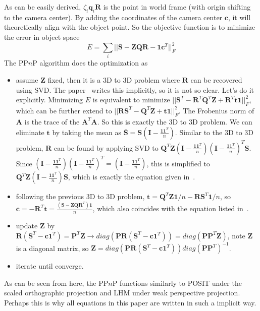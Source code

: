 \documentclass[a4paper]{article}
\begin{document}
As can be easily derived, $\zeta_i \mathbf{q}_i \mathbf{R}$ is the point in world frame (with origin shifting to the camera center). By adding the coordinates of the camera center $\mathbf{c}$, it will theoretically align with the object point. So the objective function is to minimize the error in object space
$$
E=\sum_{i} ||\mathbf{S}-\mathbf{ZQR}-\mathbf{1c}^T||_{F}^{2}
$$
The PP$n$P algorithm does the optimization as
\begin{itemize}
\item assume $\mathbf{Z}$ fixed, then it is a $3$D to $3$D problem where $\mathbf{R}$ can be recovered using SVD. The paper~\cite{garro2012solving} writes this implicitly, so it is not so clear. Let's do it explicitly. Minimizing $E$ is equivalent to minimize $||\mathbf{S}^T-\mathbf{R}^T\mathbf{Q}^T\mathbf{Z}+\mathbf{R}^T\mathbf{t1}||_{F}^{2}$, which can be further extend to $||\mathbf{R}\mathbf{S}^T-\mathbf{Q}^T\mathbf{Z}+\mathbf{t1}||_{F}^{2}$. The Frobenius norm of $\mathbf{A}$ is the trace of the $\mathbf{A}^T\mathbf{A}$. So this is exactly the $3$D to $3$D problem. We can eliminate $\mathbf{t}$ by taking the mean as $\bar{\mathbf{S}}=\mathbf{S}(\mathbf{I}-\frac{\mathbf{11}^T}{n})$. Similar to the $3$D to $3$D problem, $\mathbf{R}$ can be found by applying SVD to $\mathbf{Q}^T\mathbf{Z}(\mathbf{I}-\frac{\mathbf{11}^T}{n})(\mathbf{I}-\frac{\mathbf{11}^T}{n})^T\mathbf{S}$. Since $(\mathbf{I}-\frac{\mathbf{11}^T}{n})(\mathbf{I}-\frac{\mathbf{11}^T}{n})^T=(\mathbf{I}-\frac{\mathbf{11}^T}{n})$, this is simplified to $\mathbf{Q}^T\mathbf{Z}(\mathbf{I}-\frac{\mathbf{11}^T}{n})\mathbf{S}$, which is exactly the equation given in~\cite{garro2012solving}.
\item following the previous $3$D to $3$D problem, $\mathbf{t}=\mathbf{Q}^T\mathbf{Z1}/n-\mathbf{R}\mathbf{S}^T\mathbf{1}/n$, so $\mathbf{c}=-\mathbf{R}^T\mathbf{t}=\frac{({\mathbf{S}-\mathbf{ZQR}}^T)\mathbf{1}}{n}$, which also coincides with the equation listed in~\cite{garro2012solving}.
\item update $\mathbf{Z}$ by $\mathbf{R}(\mathbf{S}^T-\mathbf{c1}^T)=\mathbf{P}^T\mathbf{Z} \to diag(\mathbf{P}\mathbf{R}(\mathbf{S}^T-\mathbf{c1}^T))=diag(\mathbf{P}\mathbf{P}^T\mathbf{Z})$, note $\mathbf{Z}$ is a diagonal matrix, so $\mathbf{Z}=diag(\mathbf{P}\mathbf{R}(\mathbf{S}^T-\mathbf{c1}^T))diag(\mathbf{P}\mathbf{P}^T)^{-1}$.
\item iterate until converge.
\end{itemize}
As can be seen from here, the PP$n$P functions similarly to POSIT under the scaled orthographic projection and LHM under weak perspective projection. Perhaps this is why all equations in this paper are written in such a implicit way.
\end{document}
